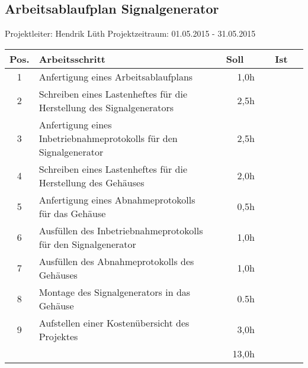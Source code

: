 \documentclass[a4paper,12pt, landscape]{article}
\begin{document}
\begin{center}
\section*{Arbeitsablaufplan Signalgenerator}
Projektleiter: Hendrik Lüth \qquad Projektzeitraum: 01.05.2015 - 31.05.2015
\medskip

\begin{tabular}{lp{15cm}|r|r|}
\hline
\multicolumn{1}{|c|}{Pos.} & Arbeitsschritt & ~~Soll~~ & ~~Ist~~ \\ \hline
\multicolumn{1}{|c|}{1} & Anfertigung eines Arbeitsablaufplans & 1,0h &  \\ \hline
\multicolumn{1}{|c|}{2} & Schreiben eines Lastenheftes für die Herstellung des Signalgenerators & 2,5h &  \\ \hline
\multicolumn{1}{|c|}{3} & Anfertigung eines Inbetriebnahmeprotokolls für den Signalgenerator & 2,5h &  \\ \hline
\multicolumn{1}{|c|}{4} & Schreiben eines Lastenheftes für die Herstellung des Gehäuses & 2,0h &  \\ \hline
\multicolumn{1}{|c|}{5} & Anfertigung eines Abnahmeprotokolls für das Gehäuse & 0,5h &  \\ \hline
\multicolumn{1}{|c|}{6} & Ausfüllen des Inbetriebnahmeprotokolls für den Signalgenerator & 1,0h &  \\ \hline
\multicolumn{1}{|c|}{7} & Ausfüllen des Abnahmeprotokolls des Gehäuses & 1,0h &  \\ \hline
\multicolumn{1}{|c|}{8} & Montage des Signalgenerators in das Gehäuse & 0.5h &  \\ \hline
\multicolumn{1}{|c|}{9} & Aufstellen einer Kostenübersicht des Projektes & 3,0h &  \\ \hline
                       &  & 13,0h &  \\ \cline{3-4} 
\end{tabular}
 
\end{center}
\end{document}
